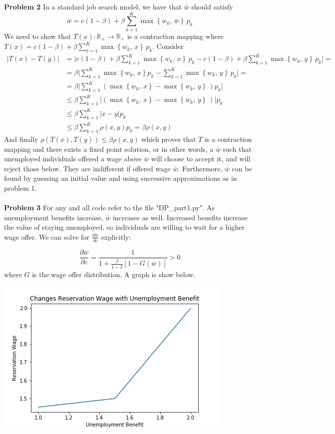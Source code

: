 \documentclass[letterpaper,12pt]{article}
\theoremstyle{definition}
\newcommand{\R}{\mathbb{R}}
\begin{document}
\noindent\textbf{Problem 2}
In a standard job search model, we have that $\bar w$ should satisfy 
$$
    \bar w
    = c (1-\beta) + \beta
    \sum_{k=1}^K \max \left\{
        w_k ,\, \bar w
    \right\}
    \, p_k
$$
We need to show that $T(x): \R_+ \to \R_+$  is a contraction mapping where $T(x) =  c (1-\beta) + \beta \sum_{k=1}^K \max \left\{w_k ,\, x\right\} \, p_k$. Consider
\begin{equation*}
\begin{aligned}
 |T(x)- T(y)| & =  \big |c (1-\beta) + \beta \sum_{k=1}^K \max \left\{w_k ,\, x\right\} \, p_k - c (1-\beta) + \beta \sum_{k=1}^K \max \left\{w_k ,\, y\right\} \, p_k \big |=\\
& = \beta \big |\sum_{k=1}^K \max \left\{w_k ,\, x\right\}p_k - \sum_{k=1}^K \max \left\{w_k ,\, y\right\} \, p_k \big | = \\
& = \beta \big |\sum_{k=1}^K (\max \left\{w_k ,\, x\right\} -  \max \left\{w_k ,\, y\right\} \,) p_k \big |  \\
& \leq \beta \sum_{k=1}^K \big |(\max \left\{w_k ,\, x\right\} -  \max \left\{w_k ,\, y\right\} \,) \big |p_k   \\
& \leq \beta \sum_{k=1}^K | x - y | p_k \\
&\leq \beta \sum_{k=1}^K \rho(x,y) p_k = \beta \rho(x,y)
\end{aligned}
\end{equation*} 
And finally $\rho(T(x), T(y)) \leq \beta \rho(x,y)$ which proves that $T$ is a contraction mapping and there exists a fixed point solution, or in other words, a $\bar w$ such that unemployed individuals offered a wage above $\bar w$ will choose to accept it, and will reject those below. They are indifferent if offered wage $\bar w$. Furthermore, $\bar w$ can be found by guessing an initial value and using successive approximations as in problem 1. \\\\
\noindent\textbf{Problem 3} 
For any and all code refer to the file "DP\_part1.py". As unemployment benefits increase, $\bar w$ increases as well. Increased benefits increase the value of staying unemployed, so individuals are willing to wait for a higher wage offer. We can solve for $\frac{\partial \bar w}{\partial c}$ explicitly: 

$$\frac{\partial \bar w}{\partial c} = \frac{1}{1+\frac{\beta}{1-\beta}[1-G(\bar w)]} > 0$$
where $G$ is the wage offer distribution.  A graph is show below. 

\includegraphics{rwage.jpeg}
\end{document}
